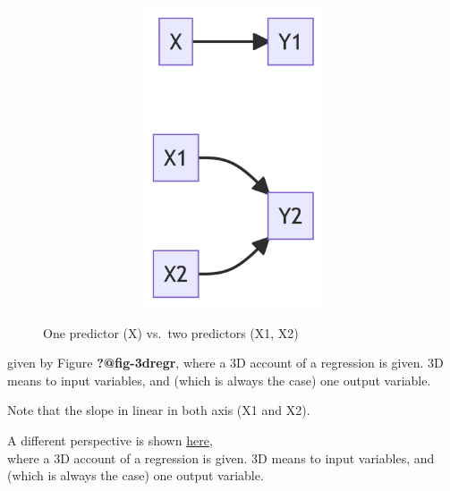 \documentclass[
  letterpaper,
  DIV=11,
  numbers=noendperiod]{scrreprt}
\theoremstyle{definition}
\theoremstyle{definition}
\theoremstyle{remark}
\begin{document}
\begin{figure}

{\centering 

\begin{figure}[H]

{\centering \includegraphics[width=6.5in,height=3.5in]{./regression2_files/figure-latex/mermaid-figure-1.png}

}

\end{figure}

}

\caption{\label{fig-multregr}One predictor (X) vs.~two predictors (X1,
X2)}

\end{figure}

given by Figure \textbf{?@fig-3dregr}, where a 3D account of a
regression is given. 3D means to input variables, and (which is always
the case) one output variable.

\begin{tcolorbox}[enhanced jigsaw, bottomtitle=1mm, opacitybacktitle=0.6, arc=.35mm, colframe=quarto-callout-note-color-frame, left=2mm, bottomrule=.15mm, coltitle=black, toptitle=1mm, breakable, opacityback=0, colbacktitle=quarto-callout-note-color!10!white, titlerule=0mm, title=\textcolor{quarto-callout-note-color}{\faInfo}\hspace{0.5em}{Note}, leftrule=.75mm, toprule=.15mm, colback=white, rightrule=.15mm]
Note that the slope in linear in both axis (X1 and X2).
\end{tcolorbox}

A different perspective is shown
\href{https://upload.wikimedia.org/wikipedia/commons/a/ae/2d_multiple_linear_regression.gif?20161014061355}{here},\\
where a 3D account of a regression is given. 3D means to input
variables, and (which is always the case) one output variable.
\end{document}
